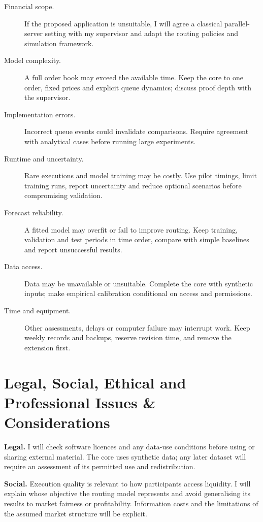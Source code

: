 \documentclass[10pt,a4paper,oneside]{article}
\begin{document}
\begin{description}
\item[Financial scope.] If the proposed application is unsuitable, I will agree a classical parallel-server setting with my supervisor and adapt the routing policies and simulation framework.
\item[Model complexity.] A full order book may exceed the available time. Keep the core to one order, fixed prices and explicit queue dynamics; discuss proof depth with the supervisor.
\item[Implementation errors.] Incorrect queue events could invalidate comparisons. Require agreement with analytical cases before running large experiments.
\item[Runtime and uncertainty.] Rare executions and model training may be costly. Use pilot timings, limit training runs, report uncertainty and reduce optional scenarios before compromising validation.
\item[Forecast reliability.] A fitted model may overfit or fail to improve routing. Keep training, validation and test periods in time order, compare with simple baselines and report unsuccessful results.
\item[Data access.] Data may be unavailable or unsuitable. Complete the core with synthetic inputs; make empirical calibration conditional on access and permissions.
\item[Time and equipment.] Other assessments, delays or computer failure may interrupt work. Keep weekly records and backups, reserve revision time, and remove the extension first.
\end{description}

\section{Legal, Social, Ethical and Professional Issues \& Considerations}

\textbf{Legal.} I will check software licences and any data-use conditions before using or sharing external material. The core uses synthetic data; any later dataset will require an assessment of its permitted use and redistribution.

\textbf{Social.} Execution quality is relevant to how participants access liquidity. I will explain whose objective the routing model represents and avoid generalising its results to market fairness or profitability. Information costs and the limitations of the assumed market structure will be explicit.
\end{document}
